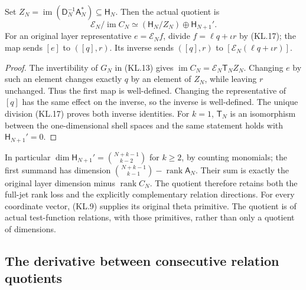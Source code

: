 \begin{theorem}
Set \(Z_N=\operatorname{im}(\mathsf D_N^{-1}\mathsf A_N^*)
\subseteq\mathsf H_N\).  Then the actual quotient is
\[
 \boxed{\mathcal E_N/\operatorname{im}C_N
   \simeq(\mathsf H_N/Z_N)\oplus\mathsf H_{N+1}'.}        \tag{KL.18}
\]
For an original layer representative \(e=\mathscr E_N f\),
divide \(f=\ell q+\iota r\) by (KL.17); the map sends
\([e]\) to \(([q],r)\).  Its inverse sends
\(([q],r)\) to \([\mathscr E_N(\ell q+\iota r)]\).
\end{theorem}
\begin{proof}
The invertibility of \(G_N\) in (KL.13) gives
\(\operatorname{im}C_N=\mathscr E_N\mathsf T_NZ_N\).
Changing \(e\) by such an element changes exactly \(q\) by an
element of \(Z_N\), while leaving \(r\) unchanged.  Thus the
first map is well-defined.  Changing the representative of \([q]\)
has the same effect on the inverse, so the inverse is well-defined.
The unique division (KL.17) proves both inverse identities.
For \(k=1\), \(\mathsf T_N\) is an isomorphism between the
one-dimensional shell spaces and the same statement holds with
\(\mathsf H_{N+1}'=0\).
\end{proof}

In particular \(\dim\mathsf H_{N+1}'=\binom{N+k-1}{k-2}\)
for \(k\geq2\), by counting monomials; the first summand has
dimension \(\binom{N+k-1}{k-1}-\operatorname{rank}\mathsf A_N\).
Their sum is exactly the original layer dimension minus
\(\operatorname{rank}C_N\).  The quotient therefore retains both
the full-jet rank loss and the explicitly complementary relation
directions.  For every coordinate vector, (KL.9) supplies its original
theta primitive.  The quotient is of actual test-function relations,
with those primitives, rather than only a quotient of dimensions.

\subsection{The derivative between consecutive relation quotients}

